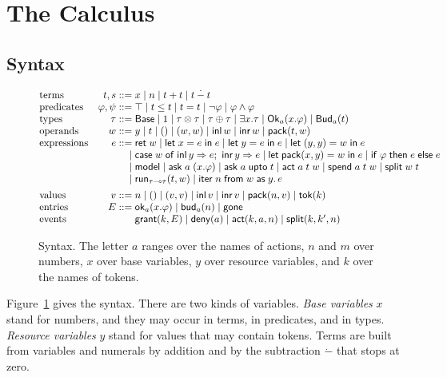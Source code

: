 \documentclass[acmsmall,nonacm,screen]{acmart}
\newcommand{\kw}[1]{\mathsf{#1}}
\newcommand{\Base}{\kw{Base}}
\newcommand{\Ok}[2]{\kw{Ok}_{#1}(#2)}
\newcommand{\Bud}[2]{\kw{Bud}_{#1}(#2)}
\newcommand{\ok}[2]{\kw{ok}_{#1}(#2)}
\newcommand{\bud}[2]{\kw{bud}_{#1}(#2)}
\newcommand{\gone}{\kw{gone}}
\newcommand{\ret}{\kw{ret}\;}
\newcommand{\model}{\kw{model}}
\newcommand{\letin}[3]{\kw{let}\;#1 = #2\;\kw{in}\;#3}
\newcommand{\ite}[3]{\kw{if}\;#1\;\kw{then}\;#2\;\kw{else}\;#3}
\newcommand{\ask}[2]{\kw{ask}\;#1\;(#2)}
\newcommand{\askupto}[2]{\kw{ask}\;#1\;\kw{upto}\;#2}
\newcommand{\act}[3]{\kw{act}\;#1\;#2\;#3}
\newcommand{\spend}[3]{\kw{spend}\;#1\;#2\;#3}
\newcommand{\splt}[2]{\kw{split}\;#1\;#2}
\newcommand{\run}[4]{\kw{run}_{#1 \multimap #2}(#3, #4)}
\newcommand{\iter}[4]{\kw{iter}\;#1\;\kw{from}\;#2\;\kw{as}\;#3.\,#4}
\newcommand{\pack}[2]{\kw{pack}(#1, #2)}
\newcommand{\inl}{\kw{inl}\,}
\newcommand{\inr}{\kw{inr}\,}
\newcommand{\tok}[1]{\kw{tok}(#1)}
\newcommand{\monus}{\mathbin{\dot{-}}}
\newcommand{\grant}{\kw{grant}}
\newcommand{\deny}{\kw{deny}}
\newcommand{\evact}{\kw{act}}
\newcommand{\evsplit}{\kw{split}}
\begin{document}
\section{The Calculus}
\label{sec:calculus}

\subsection{Syntax}

\begin{figure}[t]
\[
\begin{array}{@{}l@{\quad}r@{\;}l@{}}
\text{terms} & t, s ::= & x \mid n \mid t + t \mid t \monus t \\
\text{predicates} & \varphi, \psi ::= & \top \mid t \le t \mid t = t \mid \neg\varphi \mid \varphi \wedge \varphi \\
\text{types} & \tau ::= & \Base \mid 1 \mid \tau \otimes \tau \mid \tau \oplus \tau \mid \exists x.\tau
  \mid \Ok{a}{x.\varphi} \mid \Bud{a}{t} \\
\text{operands} & w ::= & y \mid t \mid () \mid (w, w) \mid \inl w \mid \inr w \mid \pack{t}{w} \\
\text{expressions} & e ::= & \ret w \mid \letin{x}{e}{e} \mid \letin{y}{e}{e} \mid \letin{(y, y)}{w}{e} \\
 & \mid & \kw{case}\;w\;\kw{of}\;\inl y \Rightarrow e;\ \inr y \Rightarrow e
  \mid \letin{\pack{x}{y}}{w}{e} \mid \ite{\varphi}{e}{e} \\
 & \mid & \model \mid \ask{a}{x.\varphi} \mid \askupto{a}{t} \mid \act{a}{t}{w} \mid \spend{a}{t}{w}
  \mid \splt{w}{t} \\
 & \mid & \run{\tau}{\tau}{t}{w} \mid \iter{n}{w}{y}{e} \\[1ex]
\text{values} & v ::= & n \mid () \mid (v, v) \mid \inl v \mid \inr v \mid \pack{n}{v} \mid \tok{k} \\
\text{entries} & E ::= & \ok{a}{x.\varphi} \mid \bud{a}{n} \mid \gone \\
\text{events} & & \grant(k, E) \mid \deny(a) \mid \evact(k, a, n) \mid \evsplit(k, k', n)
\end{array}
\]
\caption{Syntax. The letter $a$ ranges over the names of actions, $n$ and $m$ over numbers,
$x$ over base variables, $y$ over resource variables, and $k$ over the names of tokens.}
\label{fig:syntax}
\end{figure}

Figure~\ref{fig:syntax} gives the syntax. There are two kinds of variables. \emph{Base
variables} $x$ stand for numbers, and they may occur in terms, in predicates, and in types.
\emph{Resource variables} $y$ stand for values that may contain tokens. Terms are built from
variables and numerals by addition and by the subtraction $\monus$ that stops at zero.
\end{document}
